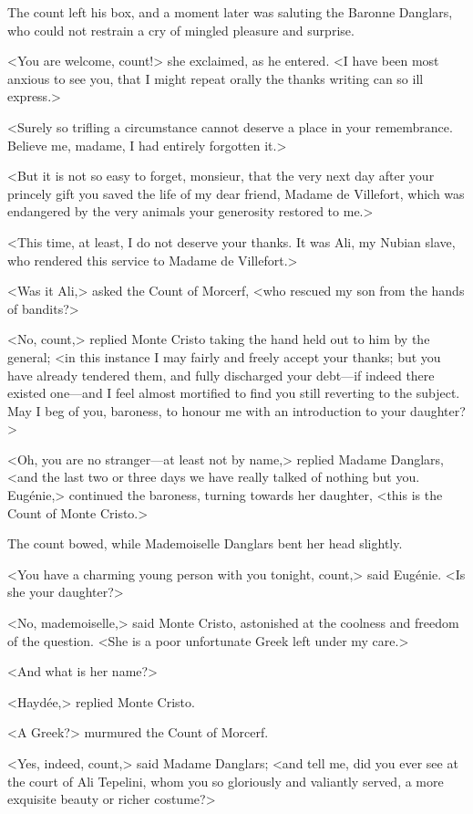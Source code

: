  The count left his box, and a moment later was saluting the Baronne Danglars, who could not restrain a cry of mingled pleasure and surprise. 

 <You are welcome, count!> she exclaimed, as he entered. <I have been most anxious to see you, that I might repeat orally the thanks writing can so ill express.> 

 <Surely so trifling a circumstance cannot deserve a place in your remembrance. Believe me, madame, I had entirely forgotten it.> 

 <But it is not so easy to forget, monsieur, that the very next day after your princely gift you saved the life of my dear friend, Madame de Villefort, which was endangered by the very animals your generosity restored to me.>  
 
 <This time, at least, I do not deserve your thanks. It was Ali, my Nubian slave, who rendered this service to Madame de Villefort.> 

 <Was it Ali,> asked the Count of Morcerf, <who rescued my son from the hands of bandits?> 

 <No, count,> replied Monte Cristo taking the hand held out to him by the general; <in this instance I may fairly and freely accept your thanks; but you have already tendered them, and fully discharged your debt—if indeed there existed one—and I feel almost mortified to find you still reverting to the subject. May I beg of you, baroness, to honour me with an introduction to your daughter?> 

 <Oh, you are no stranger—at least not by name,> replied Madame Danglars, <and the last two or three days we have really talked of nothing but you. Eugénie,> continued the baroness, turning towards her daughter, <this is the Count of Monte Cristo.> 

 The count bowed, while Mademoiselle Danglars bent her head slightly. 

 <You have a charming young person with you tonight, count,> said Eugénie. <Is she your daughter?> 

 <No, mademoiselle,> said Monte Cristo, astonished at the coolness and freedom of the question. <She is a poor unfortunate Greek left under my care.> 

 <And what is her name?> 

 <Haydée,> replied Monte Cristo. 

 <A Greek?> murmured the Count of Morcerf. 

 <Yes, indeed, count,> said Madame Danglars; <and tell me, did you ever see at the court of Ali Tepelini, whom you so gloriously and valiantly served, a more exquisite beauty or richer costume?> 

